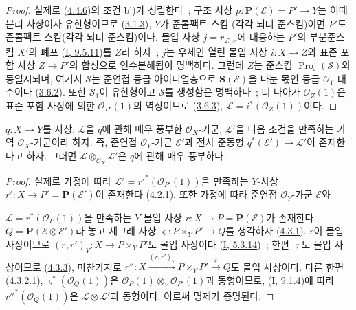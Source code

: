\begin{proof}
실제로 (\hyperref[II.4.4.6-ko]{4.4.6})의 조건 b')가 성립한다~;
구조 사상 $p:\mathbf{P}(\mathcal{E})=P'\to Y$는 이때 분리 사상이자
유한형이므로 (\hyperref[II.3.1.3-ko]{3.1.3}), $Y$가 준콤팩트 스킴
(각각 뇌터 준스킴)이면 $P'$도 준콤팩트 스킴(각각 뇌터 준스킴)이다.
몰입 사상 $j=r_{\mathcal{L},\varphi}$에 대응하는 $P'$의 부분준스킴
$X'$의 폐포 (\hyperref[I.9.5.11-ko]{I, 9.5.11})를 $Z$라 하자~;
$j$는 우세인 열린 몰입 사상 $i:X\to Z$와 표준 포함 사상
$Z\to P'$의 합성으로 인수분해됨이 명백하다. 그런데 $Z$는 준스킴
$\operatorname{Proj}(\mathcal{S})$와 동일시되며, 여기서 $\mathcal{S}$는
준연접 등급 아이디얼층으로 $\mathbf{S}(\mathcal{E})$을 나눈 몫인 등급
$\mathcal{O}_Y$-대수이다 (\hyperref[II.3.6.2-ko]{3.6.2}). 또한
$\mathcal{S}_1$이 유한형이고 $\mathcal{S}$를 생성함은 명백하다~;
더 나아가 $\mathcal{O}_Z(1)$은 표준 포함 사상에 의한
$\mathcal{O}_{P'}(1)$의 역상이므로
(\hyperref[II.3.6.3-ko]{3.6.3}),
$\mathcal{L}=i^*(\mathcal{O}_Z(1))$이다.
\end{proof}

\begin{proposition}[4.4.8]
\label{II.4.4.8-ko}
$q:X\to Y$를 사상, $\mathcal{L}$을 $q$에 관해 매우 풍부한
$\mathcal{O}_X$-가군, $\mathcal{L}'$을 다음 조건을 만족하는 가역
$\mathcal{O}_X$-가군이라 하자. 즉, 준연접 $\mathcal{O}_Y$-가군
$\mathcal{E}'$과 전사 준동형
$q^*(\mathcal{E}')\to\mathcal{L}'$이 존재한다고 하자. 그러면
$\mathcal{L}\otimes_{\mathcal{O}_X}\mathcal{L}'$은 $q$에 관해 매우
풍부하다.
\end{proposition}

\begin{proof}
실제로 가정에 따라
$\mathcal{L}'=r'^*(\mathcal{O}_{P'}(1))$을 만족하는 $Y$-사상
$r':X\to P'=\mathbf{P}(\mathcal{E}')$이 존재한다
(\hyperref[II.4.2.1-ko]{4.2.1}). 또한 가정에 따라 준연접
$\mathcal{O}_Y$-가군 $\mathcal{E}$와


$\mathcal{L}=r^*(\mathcal{O}_P(1))$을 만족하는 $Y$-몰입 사상
$r:X\to P=\mathbf{P}(\mathcal{E})$가 존재한다.
$Q=\mathbf{P}(\mathcal{E}\otimes\mathcal{E}')$라 놓고 세그레 사상
$\varsigma:P\times_YP'\to Q$를 생각하자
(\hyperref[II.4.3.1-ko]{4.3.1}). $r$이 몰입 사상이므로
$(r,r')_Y:X\to P\times_YP'$도 몰입 사상이다
(\hyperref[I.5.3.14-ko]{I, 5.3.14})~; 한편 $\varsigma$도 몰입
사상이므로 (\hyperref[II.4.3.3-ko]{4.3.3}),
마찬가지로
$r'':X\xrightarrow{(r,r')_Y}P\times_YP'\xrightarrow{\varsigma}Q$도
몰입 사상이다. 다른 한편 (\hyperref[II.4.3.2.1-ko]{4.3.2.1}),
$\varsigma^*(\mathcal{O}_Q(1))$은
$\mathcal{O}_P(1)\otimes_Y\mathcal{O}_{P'}(1)$과 동형이므로,
(\hyperref[I.9.1.4-ko]{I, 9.1.4})에 따라
$r''^*(\mathcal{O}_Q(1))$은 $\mathcal{L}\otimes\mathcal{L}'$과
동형이다. 이로써 명제가 증명된다.
\end{proof}

